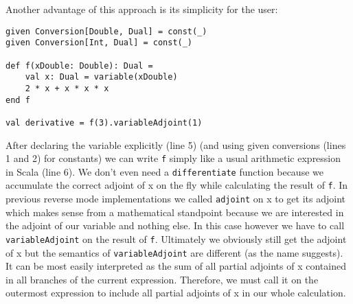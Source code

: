 Another advantage of this approach is its simplicity for the user:
\begin{lstlisting}
given Conversion[Double, Dual] = const(_)
given Conversion[Int, Dual] = const(_)

def f(xDouble: Double): Dual =
    val x: Dual = variable(xDouble)
    2 * x + x * x * x
end f

val derivative = f(3).variableAdjoint(1)
\end{lstlisting}
After declaring the variable explicitly (line 5) (and using given conversions (lines 1 and 2) for constants) we can write \lstinline{f} simply like a usual arithmetic expression in Scala (line 6). We don't even need a \lstinline{differentiate} function because we accumulate the correct adjoint of x on the fly while calculating the result of \lstinline{f}. In previous reverse mode implementations we called \lstinline{adjoint} on x to get its adjoint which makes sense from a mathematical standpoint because we are interested in the adjoint of our variable and nothing else. In this case however we have to call \lstinline{variableAdjoint} on the result of \lstinline{f}. Ultimately we obviously still get the adjoint of x but the semantics of \lstinline{variableAdjoint} are different (as the name suggests). It can be most easily interpreted as the sum of all partial adjoints of x contained in all branches of the current expression. Therefore, we must call it on the outermost expression to include all partial adjoints of x in our whole calculation.